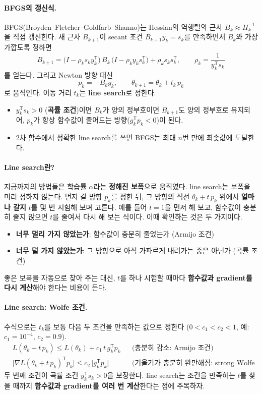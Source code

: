 \documentclass[11pt,a4paper]{article}
\newcommand{\T}{^{\mathsf T}}
\begin{document}
\paragraph{BFGS의 갱신식.}
BFGS(Broyden--Fletcher--Goldfarb--Shanno)는 Hessian의 역행렬의 근사 $B_k\approx H_k^{-1}$을 직접 갱신한다.
새 근사 $B_{k+1}$이 secant 조건 $B_{k+1}y_k=s_k$를 만족하면서 $B_k$와 가장 가깝도록 정하면
\[
\boxed{
B_{k+1}=\bigl(I-\rho_k s_ky_k\T\bigr)\,B_k\,\bigl(I-\rho_k y_ks_k\T\bigr)+\rho_k s_ks_k\T,
\qquad
\rho_k=\frac{1}{y_k\T s_k}
}
\]
를 얻는다. 그리고 Newton 방향 대신
\[
p_k=-B_kg_k,
\qquad
\theta_{k+1}=\theta_k+t_k\,p_k
\]
로 움직인다. 이동 거리 $t_k$는 \textbf{line search}로 정한다.
\begin{itemize}[leftmargin=1.8em]
\item $y_k\T s_k>0$ (\textbf{곡률 조건})이면 $B_k$가 양의 정부호이면 $B_{k+1}$도 양의 정부호로 유지되어,
$p_k$가 항상 함수값이 줄어드는 방향($g_k\T p_k<0$)이 된다.
\item 2차 함수에서 정확한 line search를 쓰면 BFGS는 최대 $n$번 만에 최솟값에 도달한다.
\end{itemize}

\paragraph{Line search란?}
지금까지의 방법들은 학습률 $\alpha$라는 \textbf{정해진 보폭}으로 움직였다.
line search는 보폭을 미리 정하지 않는다.
먼저 갈 방향 $p_k$를 정한 뒤, 그 방향의 직선 $\theta_k+t\,p_k$ 위에서
\textbf{얼마나 갈지} $t$를 몇 번 시험해 보며 고른다.
예를 들어 $t=1$을 먼저 해 보고, 함수값이 충분히 줄지 않으면 $t$를 줄여서 다시 해 보는 식이다.
이때 확인하는 것은 두 가지이다.
\begin{itemize}[leftmargin=1.8em]
\item \textbf{너무 멀리 가지 않았는가}: 함수값이 충분히 줄었는가 (Armijo 조건)
\item \textbf{너무 덜 가지 않았는가}: 그 방향으로 아직 가파르게 내려가는 중은 아닌가 (곡률 조건)
\end{itemize}
좋은 보폭을 자동으로 찾아 주는 대신,
$t$를 하나 시험할 때마다 \textbf{함수값과 gradient를 다시 계산}해야 한다는 비용이 든다.

\paragraph{Line search: Wolfe 조건.}
수식으로는 $t_k$를 보통 다음 두 조건을 만족하는 값으로 정한다 ($0<c_1<c_2<1$, 예: $c_1=10^{-4}$, $c_2=0.9$).
\[
\begin{aligned}
&L(\theta_k+t\,p_k)\le L(\theta_k)+c_1\,t\,g_k\T p_k
&&\text{(충분히 감소: Armijo 조건)}\\
&\bigl|\nabla L(\theta_k+t\,p_k)\T p_k\bigr|\le c_2\,\bigl|g_k\T p_k\bigr|
&&\text{(기울기가 충분히 완만해짐: strong Wolfe 조건)}
\end{aligned}
\]
두 번째 조건이 곡률 조건 $y_k\T s_k>0$을 보장한다.
line search는 조건을 만족하는 $t$를 찾을 때까지 \textbf{함수값과 gradient를 여러 번 계산}한다는 점에 주목하자.
\end{document}
